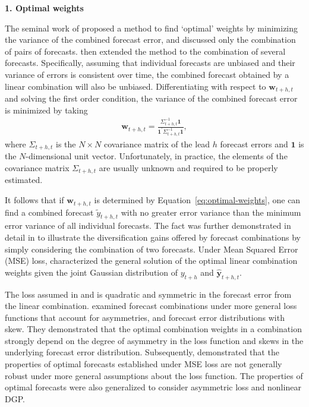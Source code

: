 \documentclass[11pt]{article}
\begin{document}
{\bf{1. Optimal weights}}

The seminal work of \cite{Bates1969-yj} proposed a method to find `optimal' weights by minimizing the variance of the combined forecast error, and discussed only the combination of pairs of forecasts. \cite{Newbold1974-lp} then extended the method to the combination of several forecasts. Specifically, assuming that individual forecasts are unbiased and their variance of errors is consistent over time, the combined forecast obtained by a linear combination will also be unbiased. Differentiating with respect to $\boldsymbol{w}_{t+h, t}$ and solving the first order condition, the variance of the combined forecast error is minimized by taking
\begin{align}
\label{eq:optimal-weights}
\boldsymbol{w}_{t+h, t}=\frac{\Sigma_{t+h, t}^{-1}\mathbf{1}}{\mathbf{1}^{\prime} \Sigma_{t+h, t}^{-1} \mathbf{1}},
\end{align}
where $\Sigma_{t+h, t}$ is the $N \times N$ covariance matrix of the lead $h$ forecast errors and $\mathbf{1}$ is the $N$-dimensional unit vector. Unfortunately, in practice, the elements of the covariance matrix $\Sigma_{t+h, t}$ are usually unknown and required to be properly estimated.

It follows that if $\boldsymbol{w}_{t+h, t}$ is determined by Equation~\eqref{eq:optimal-weights}, one can find a combined forecast $\tilde{y}_{t+h, t}$ with no greater error variance than the minimum error variance of all individual forecasts. The fact was further demonstrated in detail in \cite{Timmermann2006-en} to illustrate the diversification gains offered by forecast combinations by simply considering the combination of two forecasts. Under Mean Squared Error (MSE) loss, \cite{Timmermann2006-en} characterized the general solution of the optimal linear combination weights given the joint Gaussian distribution of $y_{t+h}$ and $\hat{\mathbf{y}}_{t+h, t}$.

The loss assumed in \cite{Bates1969-yj} and \cite{Newbold1974-lp} is quadratic and symmetric in the forecast error from the linear combination. \cite{Elliott2004-dz} examined forecast combinations under more general loss functions that account for asymmetries, and forecast error distributions with skew. They demonstrated that the optimal combination weights in a combination strongly depend on the degree of asymmetry in the loss function and skews in the underlying forecast error distribution. Subsequently, \cite{Patton2007-zo} demonstrated that the properties of optimal forecasts established under MSE loss are not generally robust under more general assumptions about the loss function. The properties of optimal forecasts were also generalized to consider asymmetric loss and nonlinear DGP.
\end{document}
